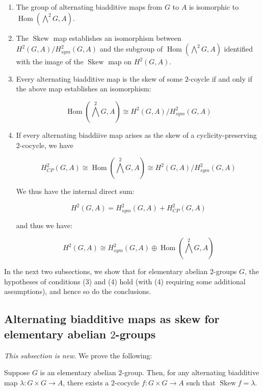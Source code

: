\documentclass[10pt]{amsart}
\newcommand{\Skew}{\operatorname{Skew}}
\begin{document}
\begin{lemma}\label{alternatingbiadditivesetup}
  \begin{enumerate}
  \item The group of alternating biadditive maps from $G$ to $A$ is
    isomorphic to $\operatorname{Hom}(\bigwedge^2G,A)$.
  \item The $\Skew$ map establishes an isomorphism between
    $H^2(G,A)/H^2_{sym}(G,A)$ and the subgroup of
    $\operatorname{Hom}(\bigwedge^2G,A)$ identified with the image of
    the $\Skew$ map on $H^2(G,A)$.
  \item Every alternating biadditive map is the skew of some
    $2$-coycle if and only if the above map establishes an isomorphism:

    $$\operatorname{Hom}(\bigwedge^2G, A) \cong H^2(G,A)/H^2_{sym}(G,A)$$
  \item If every alternating biaddiive map arises as the skew of a
    cyclicity-preserving $2$-cocycle, we have

    $$H^2_{CP}(G,A) \cong \operatorname{Hom}(\bigwedge^2G, A) \cong H^2(G,A)/H^2_{sym}(G,A)$$

    We thus have the internal direct sum:

    $$H^2(G,A) = H^2_{sym}(G,A) + H^2_{CP}(G,A)$$

    and thus we have:

    $$H^2(G,A) \cong H^2_{sym}(G,A) \oplus \operatorname{Hom}(\bigwedge^2G,A)$$
  \end{enumerate}
\end{lemma}

In the next two subsections, we show that for elementary abelian
$2$-groups $G$, the hypotheses of conditions (3) and (4) hold (with
(4) requiring some additional assumptions), and hence so do the
conclusions.

\subsection{Alternating biadditive maps as skew for elementary abelian $2$-groups}

{\em This subsection is new}. We prove the following:

\begin{lemma}\label{alternatingbiadditiveisskewinelab}
  Suppose $G$ is an elementary abelian $2$-group. Then, for any
  alternating biadditive map $\lambda:G \times G \to A$, there exists
  a $2$-cocycle $f:G \times G \to A$ such that $\Skew f = \lambda$.
\end{lemma}
\end{document}
